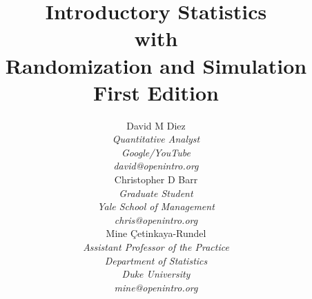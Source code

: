 
\title{\huge Introductory Statistics \\ with \\ Randomization and Simulation \vspace{1.5mm} \\ \Large First Edition}
\author{David M Diez \\
\small\emph{Quantitative Analyst} \\
\small\emph{Google/YouTube} \\
\vspace{6mm}%
\small\emph{david@openintro.org} \\
Christopher D Barr \\
\small\emph{Graduate Student} \\
\small\emph{Yale School of Management} \\
\vspace{6mm}%
\small\emph{chris@openintro.org} \\
Mine \c{C}etinkaya-Rundel \\
\small\emph{Assistant Professor of the Practice} \\
\small\emph{Department of Statistics} \\
\small\emph{Duke University} \\
\small\emph{mine@openintro.org}}
